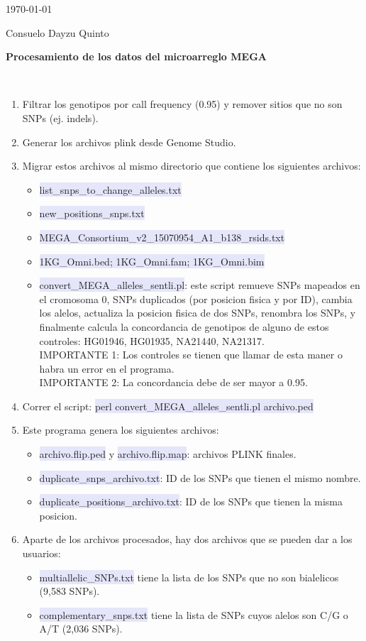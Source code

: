 \documentclass[12pt]{report}
\begin{document}
\today

Consuelo Dayzu Quinto

\begin{center}
\large \textbf{Procesamiento de los datos del microarreglo MEGA}
\end{center}
\\

\begin{enumerate}
\item Filtrar los genotipos por call frequency (0.95) y remover sitios que no son SNPs (ej. indels).
\item Generar los archivos plink desde Genome Studio.
\item Migrar estos archivos al mismo directorio que contiene los siguientes archivos:
\begin{itemize}
\item \colorbox{Lavender}{list\_snps\_to\_change\_alleles.txt}
\item \colorbox{Lavender}{new\_positions\_snps.txt}
\item \colorbox{Lavender}{MEGA\_Consortium\_v2\_15070954\_A1\_b138\_rsids.txt}
\item \colorbox{Lavender}{1KG\_Omni.bed; 1KG\_Omni.fam; 1KG\_Omni.bim}
\item \colorbox{Lavender}{convert\_MEGA\_alleles\_sentli.pl}: este script remueve SNPs mapeados en el cromosoma 0, SNPs duplicados (por posicion fisica y por ID), cambia los alelos, actualiza la posicion fisica de dos SNPs, renombra los SNPs, y finalmente calcula la concordancia de genotipos de alguno de estos controles: HG01946, HG01935, NA21440, NA21317.\\ IMPORTANTE 1: Los controles se tienen que llamar de esta maner o habra un error en el programa. \\ IMPORTANTE 2: La concordancia debe de ser mayor a 0.95. 
\end{itemize}
\item Correr el script: \colorbox{Lavender}{perl convert\_MEGA\_alleles\_sentli.pl archivo.ped}
\item Este programa genera los siguientes archivos:
\begin{itemize}
\item \colorbox{Lavender}{archivo.flip.ped} y \colorbox{Lavender}{archivo.flip.map}: archivos PLINK finales.
\item \colorbox{Lavender}{duplicate\_snps\_archivo.txt}: ID de los SNPs que tienen el mismo nombre.
\item \colorbox{Lavender}{duplicate\_positions\_archivo.txt}: ID de los SNPs que tienen la misma posicion.
\end{itemize}
\item Aparte de los archivos procesados, hay dos archivos que se pueden dar a los usuarios:
\begin{itemize}
\item \colorbox{Lavender}{multiallelic\_SNPs.txt} tiene la lista de los SNPs que no son bialelicos (9,583 SNPs). 
\item \colorbox{Lavender}{complementary\_snps.txt} tiene la lista de SNPs cuyos alelos son C/G o A/T (2,036 SNPs).
\end{itemize}
\end{enumerate}
\end{document}
